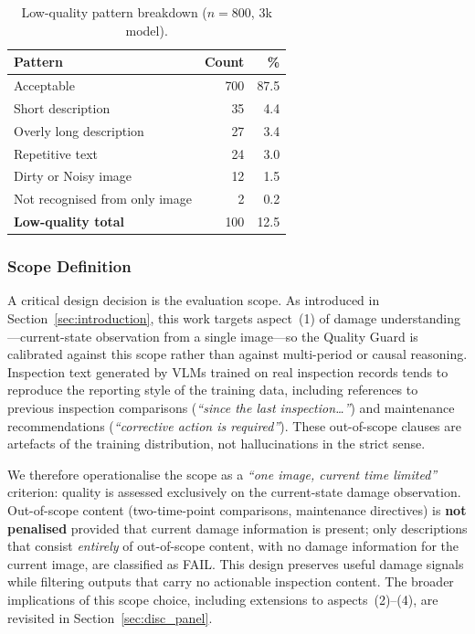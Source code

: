 \documentclass[twocolumn]{article}
\begin{document}
\begin{table}[h]
\centering
\caption{Low-quality pattern breakdown ($n=800$, 3k model).}
\label{tab:lq_patterns}
\setlength{\tabcolsep}{4pt}
\begin{tabular}{lrr}
\toprule
\textbf{Pattern} & \textbf{Count} & \textbf{\%} \\
\midrule
Acceptable                     & 700 & 87.5 \\
Short description              &  35 &  4.4 \\
Overly long description        &  27 &  3.4 \\
Repetitive text                &  24 &  3.0 \\
Dirty or Noisy image           &  12 &  1.5 \\
Not recognised from only image &   2 &  0.2 \\
\midrule
\textbf{Low-quality total}     & 100 & 12.5 \\
\bottomrule
\end{tabular}
\end{table}

\subsubsection{Scope Definition}

A critical design decision is the evaluation scope.
As introduced in Section~\ref{sec:introduction}, this work targets
aspect~(1) of damage understanding---current-state observation from a
single image---so the Quality Guard is calibrated against this scope
rather than against multi-period or causal reasoning.
Inspection text generated by VLMs trained on real inspection records
tends to reproduce the reporting style of the training data, including
references to previous inspection comparisons
(\textit{``since the last inspection\ldots''}) and maintenance
recommendations (\textit{``corrective action is required''}).
These out-of-scope clauses are artefacts of the training distribution,
not hallucinations in the strict sense.

We therefore operationalise the scope as a \textit{``one image,
current time limited''} criterion:
quality is assessed exclusively on the current-state damage observation.
Out-of-scope content (two-time-point comparisons, maintenance directives)
is \textbf{not penalised} provided that current damage information is
present; only descriptions that consist \textit{entirely} of out-of-scope
content, with no damage information for the current image, are classified
as FAIL.
This design preserves useful damage signals while filtering outputs that
carry no actionable inspection content.
The broader implications of this scope choice, including extensions to
aspects~(2)--(4), are revisited in Section~\ref{sec:disc_panel}.
\end{document}

